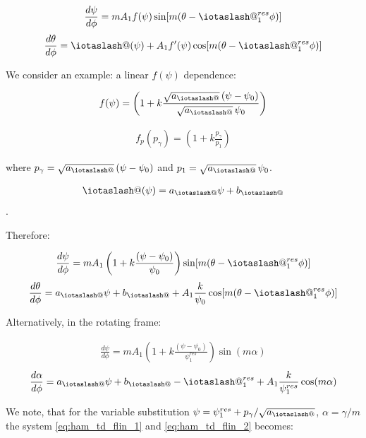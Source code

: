 \documentclass[11pt,a4paper,oneside]{article}
\makeatletter
\newcommand{\iotaslash}{{\mathpalette\iotaslash@\relax}}
\newcommand{\iotaslash@}[2]{
  \raisebox{-0.6\height}[0pt][0pt]{%
    \rotatebox[origin=Bl]{15}{$\m@th#1{\mkern-1mu\mathchar'26}$}%
  }%
  \mkern-9.5mu\nonscript\mkern-1mu
  \iota
  \mkern1mu
}
\makeatother
\begin{document}
\begin{align}
\frac{d \psi}{d\phi}=mA_1f(\psi)\sin[m(\theta-\iotaslash^{res}_1\phi)]
\end{align}
\begin{align}
\frac{d \theta}{d\phi}=\iotaslash(\psi)+A_1f'(\psi)\cos[m(\theta-\iotaslash^{res}_1\phi)]
\end{align}

We consider an example: a linear $f(\psi)$ dependence: 

\begin{align}
f(\psi)=\left(1+k\frac{\sqrt{a_\iotaslash}\,(\psi-\psi_0)}{\sqrt{a_\iotaslash}\,\psi_0}\right)
\end{align}

\begin{align}
f_p(p_\gamma)=\left(1+k\frac{p_\gamma}{p_1}\right)
\end{align}

where $p_\gamma=\sqrt{a_\iotaslash}\,(\psi-\psi_0)$ and  $p_1=\sqrt{a_\iotaslash}\,\psi_0$.

\begin{align}
\iotaslash(\psi)=a_\iotaslash\psi+b_\iotaslash
\end{align}.

Therefore:

\begin{align}
\frac{d \psi}{d\phi}=mA_1\left(1+k\frac{(\psi-\psi_0)}{\psi_0}\right)\sin[m(\theta-\iotaslash^{res}_1\phi)]
\end{align}
\begin{align}
\frac{d \theta}{d\phi}=a_\iotaslash\psi+b_\iotaslash+A_1\frac{k}{\psi_0}\cos[m(\theta-\iotaslash^{res}_1\phi)]
\end{align}

Alternatively, in the rotating frame:

\begin{align}\label{eq:ham_td_flin_1}
\frac{d \psi}{d\phi}=mA_1\left(1+k\frac{(\psi-\psi_0)}{\psi^{res}_1}\right)\sin(m\alpha)
\end{align}
\begin{align}\label{eq:ham_td_flin_2}
\frac{d \alpha}{d\phi}=a_\iotaslash\psi+b_\iotaslash-\iotaslash^{res}_1+A_1\frac{k}{\psi^{res}_1}\cos(m\alpha)
\end{align}

We note, that for the variable substitution $\psi=\psi^{res}_1+p_\gamma/\sqrt{a_\iotaslash}$, $\alpha=\gamma/m$ the system \eqref{eq:ham_td_flin_1} and \eqref{eq:ham_td_flin_2} becomes:
\end{document}
